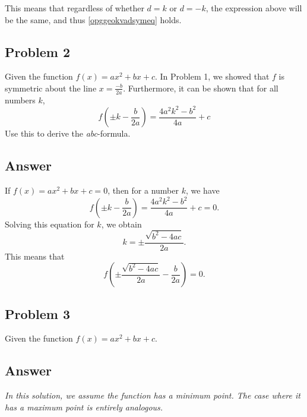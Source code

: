 \documentclass[english,oneside, hidelinks, 11 pt, class=report,crop=false]{standalone}
\begin{document}
This means that regardless of whether $d = k$ or $d = -k$, the expression above will be the same, and thus \eqref{opggeokvadsymeq} holds.

\subsection*{Problem 2}
Given the function $f(x) = ax^2 + bx + c$. In Problem 1, we showed that $f$ is symmetric about the line $x = \frac{-b}{2a}$. Furthermore, it can be shown that for all numbers $k$,
\[
f\left(\pm k - \frac{b}{2a}\right) = \frac{4a^2k^2 - b^2}{4a} + c
\]
Use this to derive the \textit{abc}-formula.

\subsection*{Answer}
If \( f(x) = ax^2 + bx + c = 0 \), then for a number \( k \), we have
\[
f\left(\pm k - \frac{b}{2a}\right) = \frac{4a^2k^2 - b^2}{4a} + c = 0.
\]
Solving this equation for \( k \), we obtain
\[
k = \pm \frac{\sqrt{b^2 - 4ac}}{2a}.
\]
This means that
\[
f\left(\pm \frac{\sqrt{b^2 - 4ac}}{2a} - \frac{b}{2a}\right) = 0.
\]
\newpage
\subsection*{Problem 3}
Given the function \( f(x) = ax^2 + bx + c \).


\subsection*{Answer}
\textit{In this solution, we assume the function has a minimum point. The case where it has a maximum point is entirely analogous.}
\end{document}
